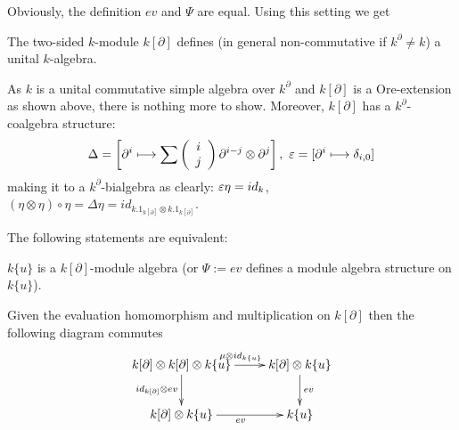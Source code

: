 \bmk %
Obviously, the definition $ev$ and $\Psi$ are equal. Using this setting we get
\begin{koro}
The two-sided $k$-module $k[\partial]$ defines (in general non-commutative if $k^\partial \neq k$) a unital $k$-algebra.
\end{koro}
\bws As $k$ is a unital commutative simple algebra over $k^\partial$ and $k[\partial]$ is a Ore-extension as shown above, there is nothing more to show.%
\bmk Moreover, $k[\partial]$ has a $k^\partial$-coalgebra structure:
$$\Delta =\left[ \partial^i \longmapsto \sum \left(\bao{c}i\\j\\\ea\right) \partial^{i-j} \otimes \partial^j\right],\ \eps = [\partial^i \longmapsto \delta_{i,0}]$$
making it to a $k^\partial$-bialgebra as clearly: $\eps \eta = id_k$, $(\eta \otimes \eta) \circ \eta = \Delta \eta = id_{k.1_{k[\partial]} \otimes k.1_{k[\partial]}}$.%
\begin{prop}
The following statements are equivalent:
\bn
\item\label{item01} $k\{u\}$ is a $k[\partial]$-module algebra (or $\Psi := ev$ defines a module algebra structure on $k\{u\}$).
\item \label{item02} Given the evaluation homomorphism and multiplication on $k[\partial]$ then the following diagram commutes
$$\xymatrix{
k[\partial] \otimes k[\partial] \otimes k\{u\} \ar[r]^{\mu \otimes id_{k\{u\}}}\ar[d]_{id_{k[\partial]} \otimes ev} & k[\partial] \otimes k\{u\}\ar[d]^{ev}\\
k[\partial] \otimes k\{u\} \ar[r]_{ev} & k\{u\}\\
}$$
\en
\end{prop}
